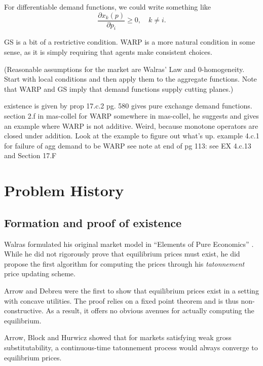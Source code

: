\documentclass{article}
\begin{document}
For differentiable demand functions, we could write something like
\[
\frac{\partial x_k(p)}{\partial p_i} \geq 0,\quad k \neq i.
\]

GS is a bit of a restrictive condition. WARP is a more natural condition in some
sense, as it is simply requiring that agents make consistent choices.

(Reasonable assumptions for the market are Walras' Law and 0-homogeneity.
Start with local conditions and then apply them to the aggregate functions.
Note that WARP and GS imply that demand functions supply cutting planes.)


existence is given by prop 17.c.2
pg. 580 gives pure exchange demand functions.
section 2.f in mas-collel for WARP
somewhere in mas-collel, he suggests and gives an example where
WARP is not additive. Weird, because monotone operators are closed under addition.
Look at the example to figure out what's up.
example 4.c.1 for failure of agg demand to be WARP
see note at end of pg 113: see EX 4.c.13 and Section 17.F



\section{Problem History}
\subsection{Formation and proof of existence}
Walras formulated his original market model in ``Elements of Pure Economics'' \cite{walras1896elements}. While he did not rigorously prove that equilibrium prices must exist, he did propose the first algorithm for computing the prices through his \emph{tatonnement} price updating scheme.

Arrow and Debreu \cite{arrow1954existence} were the first to show that equilibrium prices exist in a setting with concave utilities. The proof relies on a fixed point theorem and is thus non-constructive. As a result, it offers no obvious avenues for actually computing the equilibrium.

Arrow, Block and Hurwicz \cite{arrow1959stability} showed that for markets satisfying weak gross substitutability, a continuous-time tatonnement process would always converge to equilibrium prices.
\end{document}
